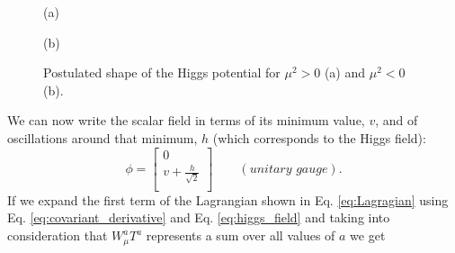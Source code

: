 \begin{figure}
	\begin{minipage}[t]{0.5\textwidth}
		\caption*{(a)}
	\end{minipage}%
	\hfill
	\begin{minipage}[t]{0.5\textwidth}
		\caption*{(b)}
	\end{minipage}
	\caption{Postulated shape of the Higgs potential for $\mu^2>0$ (a) and $\mu^2<0$ (b).}
	\label{fig:higgsV}
\end{figure}

We can now write the scalar field in terms of its minimum value, $v$, and of oscillations around that minimum, $h$ (which corresponds to the Higgs field):
\begin{equation}
\phi = \begin{bmatrix}
0 \\
v+\frac{h}{\sqrt{2}} \\
\end{bmatrix} \qquad (\textit{unitary gauge}).
\label{eq:higgs_field}
\end{equation}
If we expand the first term of the Lagrangian shown in Eq. \ref{eq:Lagragian} using Eq. \ref{eq:covariant_derivative} and Eq. \ref{eq:higgs_field} and taking into consideration that $W^a_{\mu}T^a$ represents a sum over all values of $a$ we get

